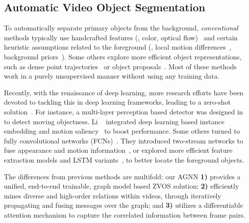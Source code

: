 \documentclass[10pt,twocolumn,letterpaper]{article}
\begin{document}
\subsection{Automatic Video Object Segmentation}
	\vspace*{-2pt}	
\label{sec:vos}
To automatically separate primary objects from the background, \textit{conventional} methods typically use handcrafted features (\eg, color, optical flow)~\cite{DBLP:conf/iccv/PapazoglouF13,DBLP:conf/bmvc/FaktorI14,tsai2016video,hu2018unsupervised} and certain heuristic assumptions related to the foreground (\ie, local motion differences~\cite{DBLP:conf/iccv/PapazoglouF13}, background priors~\cite{DBLP:conf/cvpr/WangSP15}). Some others explore more efficient object representations, such as dense point trajectories~\cite{DBLP:conf/iccv/OchsB11,DBLP:journals/pami/OchsMB14,wang2018semi} or object proposals~\cite{zhang2013,DBLP:conf/cvpr/KohK17,Koh_2018_ECCV,Lu_2018_ECCV}. Most of these methods work in a purely unsupervised manner without using any training data.

Recently, with the renaissance of deep learning, more research efforts have been devoted to tackling this in deep learning frameworks, leading to a zero-shot solution~\cite{fragkiadaki2015learning,jain2017fusionseg,DBLP:conf/iccv/TokmakovAS17,cheng2017segflow, Li_2018_CVPR,Li_2018_ECCV1,li2018flow,lu2019see}. For instance, a multi-layer perception based detector was designed in~\cite{fragkiadaki2015learning} to detect moving objectness. Li \etal~\cite{Li_2018_CVPR} integrated deep learning based instance embedding and motion saliency~\cite{Li_2018_CVPR} to boost performance. Some others turned to fully convolutional networks (FCNs)~\cite{cao2019triply,long2015fully,Ziqin2019RANet}. They introduced two-stream networks to fuse appearance and motion information~\cite{li2018flow,jain2017fusionseg,cheng2017segflow}, or explored more efficient feature extraction models and LSTM variants~\cite{Song_2018_ECCV}, to better locate the foreground objects.

The differences from previous methods are multifold: our AGNN \textbf{1)} provides a unified, end-to-end trainable, graph model based ZVOS solution; \textbf{2)} efficiently mines diverse and high-order relations within videos, through iteratively propagating and fusing messages over the graph; and \textbf{3)} utilizes a differentiable attention mechanism to capture the correlated information between frame pairs.
\vspace*{-3pt}
\end{document}
